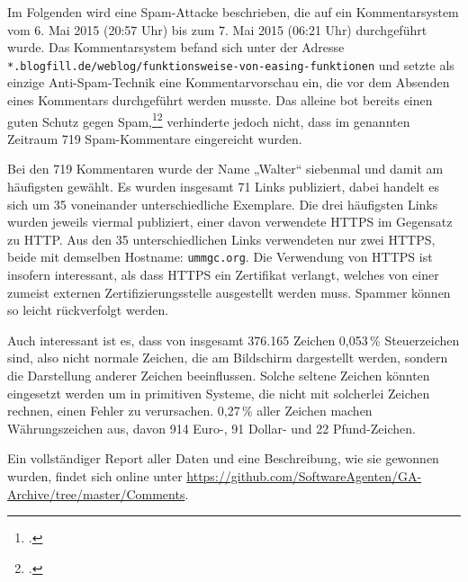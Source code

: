 Im Folgenden wird eine Spam-Attacke beschrieben, die auf ein Kommentarsystem
vom 6. Mai 2015 (20:57 Uhr) bis zum 7. Mai 2015 (06:21 Uhr) durchgeführt wurde.
Das Kommentarsystem befand sich unter der Adresse
\texttt{*.blogfill.de/weblog/funktionsweise-von-easing-funktionen} und setzte
als einzige Anti-Spam-Technik eine Kommentarvorschau ein, die vor dem Absenden
eines Kommentars durchgeführt werden musste. Das alleine bot bereits einen
guten Schutz gegen
Spam,\footcite{howSkipCommentPreview}\footcite{wordPressVsTextpattern}
verhinderte jedoch nicht, dass im genannten Zeitraum 719 Spam-Kommentare
eingereicht wurden.

Bei den 719 Kommentaren wurde der Name „Walter“ siebenmal und damit am
häufigsten gewählt. Es wurden insgesamt 71 Links publiziert, dabei handelt es
sich um 35 voneinander unterschiedliche Exemplare. Die drei häufigsten Links
wurden jeweils viermal publiziert, einer davon verwendete HTTPS im Gegensatz zu
HTTP. Aus den 35 unterschiedlichen Links verwendeten nur zwei HTTPS, beide mit
demselben Hostname: \texttt{ummgc.org}. Die Verwendung von HTTPS ist insofern
interessant, als dass HTTPS ein Zertifikat verlangt, welches von einer zumeist
externen Zertifizierungsstelle ausgestellt werden muss. Spammer können so
leicht rückverfolgt werden.

Auch interessant ist es, dass von insgesamt 376.165 Zeichen 0,053\,\%
Steuerzeichen sind, also nicht normale Zeichen, die am Bildschirm dargestellt
werden, sondern die Darstellung anderer Zeichen beeinflussen. Solche seltene
Zeichen könnten eingesetzt werden um in primitiven Systeme, die nicht mit
solcherlei Zeichen rechnen, einen Fehler zu verursachen. 0,27\,\% aller Zeichen
machen Währungszeichen aus, davon 914 Euro-, 91 Dollar- und 22 Pfund-Zeichen.

Ein vollständiger Report aller Daten und eine Beschreibung, wie sie gewonnen
wurden, findet sich online unter
\url{https://github.com/SoftwareAgenten/GA-Archive/tree/master/Comments}.

